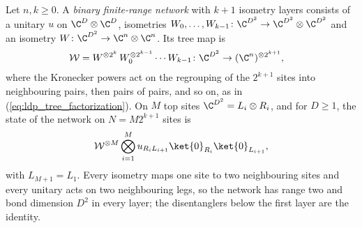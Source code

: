\begin{definition}
    \label{def:ldp_binary_mera}
    \leanok
    Let $n,k\ge0$. A \emph{binary finite-range network} with $k+1$
    isometry layers consists of a unitary $u$ on $\C^D\otimes\C^D$, isometries
    $W_0,\dots,W_{k-1}\colon\C^{D^2}\to\C^{D^2}\otimes\C^{D^2}$ and an isometry
    $W\colon\C^{D^2}\to\C^n\otimes\C^n$. Its tree map is
    \begin{align}
        \mathcal W
         & =W^{\otimes2^k}\,W_0^{\otimes2^{k-1}}\cdots W_{k-1}
        \colon\C^{D^2}\to(\C^n)^{\otimes2^{k+1}},
        \label{eq:ldp_binary_mera_tree}
    \end{align}
    where the Kronecker powers act on the regrouping of the $2^{k+1}$ sites
    into neighbouring pairs, then pairs of pairs, and so on, as in
    (\ref{eq:ldp_tree_factorization}). On $M$ top sites
    $\C^{D^2}=L_i\otimes R_i$, and for $D\ge1$, the state of the network on
    $N=M2^{k+1}$ sites is
    \begin{align}
        \mathcal W^{\otimes M}\bigotimes_{i=1}^{M}
        u_{R_iL_{i+1}}\ket{0}_{R_i}\ket{0}_{L_{i+1}},
        \label{eq:ldp_binary_mera_state}
    \end{align}
    with $L_{M+1}=L_1$. Every isometry maps one site to two neighbouring
    sites and every unitary acts on two neighbouring legs, so the network has
    range two and bond dimension $D^2$ in every layer; the disentanglers below
    the first layer are the identity.
\end{definition}

